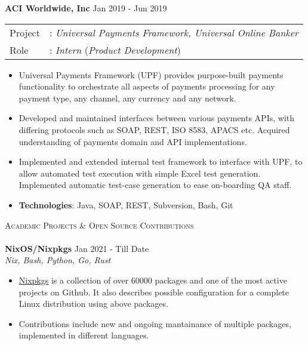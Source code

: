 \documentclass[a4paper]{article}
\newcommand{\lineunder} {
    \vspace*{-8pt} \\
    \hspace*{-18pt} \hrulefill \\
}
\newcommand{\header} [1] {
    {\hspace*{-18pt}\vspace*{6pt} \textsc{#1}}
    \vspace*{-6pt} \lineunder
}
\begin{document}
\textbf{ACI Worldwide, Inc}  \hfill Jan 2019 - Jun 2019\\
\begin{tabular}{ l l }
Project & : \textit{Universal Payments Framework, Universal Online Banker } \\
Role & : \textit{Intern} (\textit{Product Development}) \\
\end{tabular}
\vspace{-1mm}
\begin{itemize} \itemsep 1pt
	\item Universal Payments Framework (UPF) provides purpose-built payments functionality to orchestrate all aspects of payments processing for any payment type, any channel, any currency and any network.
	\item Developed and maintained interfaces between various payments APIs, with differing protocols such as SOAP, REST, ISO 8583, APACS etc. Acquired understanding of payments domain and API implementations.
	\item Implemented and extended internal test framework to interface with UPF, to allow automated test execution with simple Excel test generation. Implemented automatic test-case generation to ease on-boarding QA staff.
	\item \textbf{Technologies}: Java, SOAP, REST, Subversion, Bash, Git
\end{itemize}
\vspace{1mm}

\header{Academic Projects \& Open Source Contributions}
\vspace{1mm}
{\textbf{NixOS/Nixpkgs}} \hfill Jan 2021 - Till Date \\
\textit{Nix, Bash, Python, Go, Rust} \\
\begin{itemize}
  \item \href{https://github.com/NixOS/nixpkgs/}{Nixpkgs} is a collection of over 60000 packages and one of the most active projects on Github. It also describes possible configuration for a complete Linux distribution using above packages.
  \item Contributions include new and ongoing mantainance of multiple packages, implemented in different languages.
\end{itemize}
\vspace*{2mm}
\end{document}
